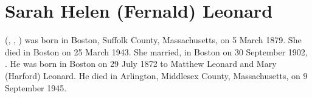 \section{Sarah Helen (Fernald) Leonard}\label{per:Sarah4Fernald}

 (, , ) was born in Boston, Suffolk County, Massachusetts, on 5 March 1879.\cite{Sarah4FernaldBirth} She died in Boston on 25 March 1943.\cite{Sarah4FernaldDeath} She married, in Boston on 30 September 1902, .\cite{Sarah4FernaldMarriage:1} He was born in Boston on 29 July 1872\cite{ChristopherLeonardBirth} to Matthew Leonard and Mary (Harford) Leonard.\cite{Sarah4FernaldMarriage:2} He died in Arlington, Middlesex County, Massachusetts, on 9 September 1945.\cite{ChristopherLeonardDeath}

